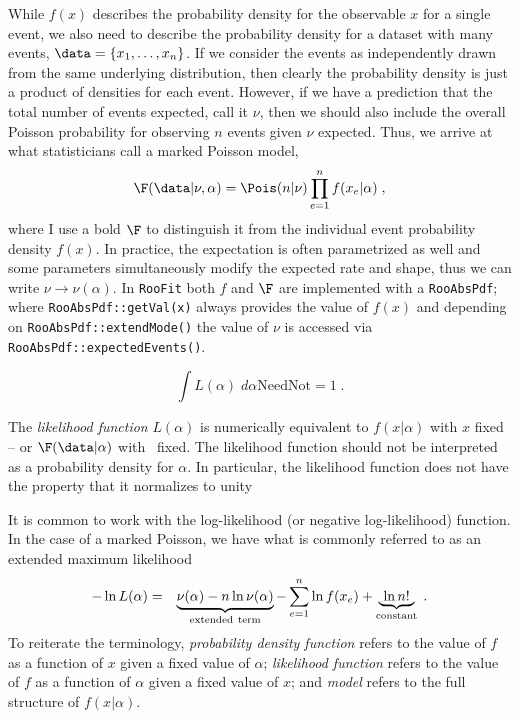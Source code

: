 While $f(x)$ describes the probability density for the observable $x$ for a single event, we also need to describe the probability density for a dataset with many events, $\data = \{x_1,\dots,x_{n}\}$.  If we consider the events as independently drawn from the same underlying distribution, then clearly the probability density is just a product of densities for each event.  However, if we have  a prediction that the total number of events expected, call it $\nu$, then we should also include the overall Poisson probability for observing $n$ events given $\nu$ expected.  Thus, we arrive at what statisticians call a marked Poisson model,
\begin{equation}\label{eqn:markedPoisson}
\F(\data|\nu,\alpha) = \Pois(n|\nu) \prod_{e=1}^n f(x_e|\alpha) \; ,
\end{equation}
where I use a bold $\F$ to distinguish it from the individual event probability density $f(x)$.  In practice, the expectation is often parametrized as well and some parameters simultaneously modify the expected rate and shape, thus we can write $\nu\rightarrow\nu(\alpha)$.  In \texttt{RooFit} both $f$ and $\F$ are implemented with a \texttt{RooAbsPdf}; where \texttt{RooAbsPdf::getVal(x)} always provides the value of $f(x)$ and depending on \texttt{RooAbsPdf::extendMode()} the value of $\nu$ is accessed via \texttt{RooAbsPdf::expectedEvents()}.


\begin{equation}
{\int L(\alpha) \;d\alpha \mathrm{Need Not =} 1}\; .
\end{equation}


The \emph{likelihood function} $L(\alpha)$ is numerically equivalent to $f(x|\alpha)$ with $x$ fixed -- or $\F(\data|\alpha)$ with \data\ fixed.  The likelihood function should not be interpreted as a probability density for $\alpha$.  In particular, the likelihood function does not have the property that it normalizes to unity


It is common to work with the log-likelihood (or negative log-likelihood) function.  In the case of a marked Poisson, we have what is commonly referred to as an extended maximum likelihood~\cite{Barlow1990496}
\begin{eqnarray}
-\ln L( \alpha) &=& \underbrace{\nu(\alpha) - n \ln \nu(\alpha)}_{\rm extended~term} - \sum_{e=1}^n \ln f(x_e)   + \underbrace{~\ln n! ~}_{\mathrm{constant}}\; .
\end{eqnarray}
To reiterate the terminology, \emph{probability density function} refers to the value of $f$ as a function of $x$ given a fixed value of $\alpha$; \emph{likelihood function} refers to the value of $f$ as a function of $\alpha$ given a fixed value of $x$; and \emph{model} refers to the full structure of $f(x|\alpha)$.


